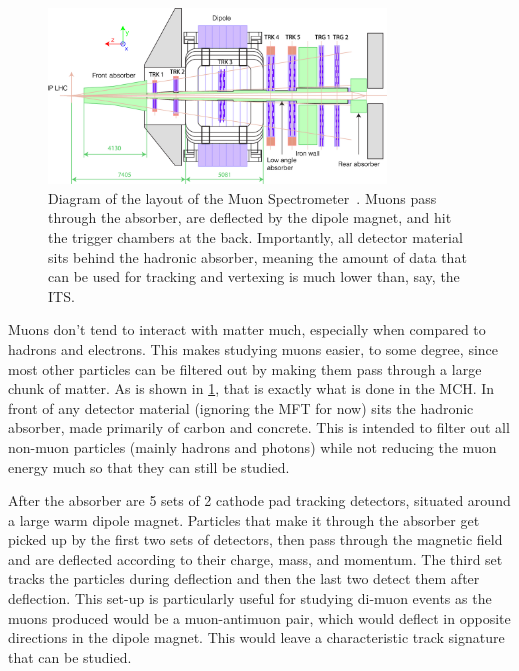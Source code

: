 \begin{figure}[ht]
    \begin{center}
        \includegraphics[width=0.8\textwidth]{Figs/MCH_schematic_pog.png}
        \caption{Diagram of the layout of the Muon Spectrometer~\cite{Muon_Spec_Schematic}. Muons pass through the absorber, are deflected by the dipole magnet, and hit the trigger chambers at the back. Importantly, all detector material sits behind the hadronic absorber, meaning the amount of data that can be used for tracking and vertexing is much lower than, say, the ITS.}
        \label{fig:Muon Spectrometer}
    \end{center}
\end{figure}

Muons don't tend to interact with matter much, especially when compared to hadrons and electrons. This makes studying muons easier, to some degree, since most other particles can be filtered out by making them pass through a large chunk of matter. As is shown in \cref{fig:Muon Spectrometer}, that is exactly what is done in the MCH. In front of any detector material (ignoring the MFT for now) sits the hadronic absorber, made primarily of carbon and concrete. This is intended to filter out all non-muon particles (mainly hadrons and photons) while not reducing the muon energy much so that they can still be studied. 

After the absorber are 5 sets of 2 cathode pad tracking detectors, situated around a large warm dipole magnet. Particles that make it through the absorber get picked up by the first two sets of detectors, then pass through the magnetic field and are deflected according to their charge, mass, and momentum. The third set tracks the particles during deflection and then the last two detect them after deflection. This set-up is particularly useful for studying di-muon events as the muons produced would be a muon-antimuon pair, which would deflect in opposite directions in the dipole magnet. This would leave a characteristic track signature that can be studied.


